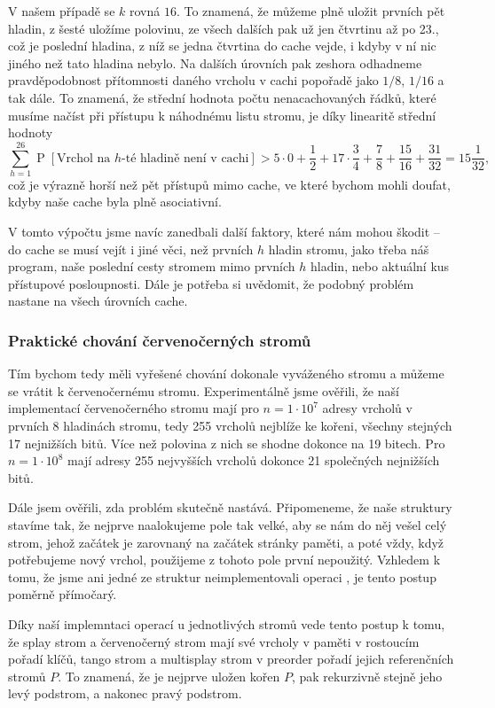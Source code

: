 V našem případě se $k$ rovná $16$. To znamená, že můžeme plně uložit prvních pět hladin, z
šesté uložíme polovinu, ze všech dalších pak už jen čtvrtinu až po 23., což je
poslední hladina, z níž se jedna čtvrtina do cache vejde, i kdyby v ní nic
jiného než tato hladina nebylo. Na dalších úrovních pak zeshora odhadneme
pravděpodobnost přítomnosti daného vrcholu v cachi popořadě jako $1/8$, $1/16$
a tak dále. To znamená, že střední hodnota počtu nenacachovaných řádků, které
musíme načíst při přístupu k náhodnému listu stromu, je díky linearitě střední
hodnoty $$\sum_{h=1}^{26} \operatorname{P}[\text{Vrchol na $h$-té hladině není v
cachi}] > 5 \cdot 0 +  \frac 12 + 17\cdot \frac34 + \frac78 + \frac{15}{16} + \frac{31}{32} = 15\frac1{32},$$ což je výrazně horší než pět přístupů mimo cache, ve které bychom mohli doufat, kdyby naše cache byla plně asociativní.   

V tomto výpočtu jsme navíc
zanedbali další faktory, které nám mohou škodit -- do cache se musí vejít i
jiné věci, než prvních $h$ hladin stromu, jako třeba náš program, naše poslední
cesty stromem mimo prvních $h$ hladin, nebo aktuální kus přístupové
posloupnosti. Dále je potřeba si uvědomit, že podobný problém nastane na všech
úrovních cache.

\subsubsection{Praktické chování červenočerných stromů}

Tím bychom tedy měli vyřešené chování dokonale vyváženého stromu a můžeme se
vrátit k červenočernému stromu. Experimentálně jsme ověřili, že naší
implementací červenočerného stromu mají pro $n=1\cdot 10^7$  adresy vrcholů v
prvních 8 hladinách stromu, tedy 255 vrcholů nejblíže ke kořeni, všechny
stejných 17 nejnižších bitů. Více než polovina z nich se shodne dokonce na 19
bitech. Pro $n=1\cdot10^8$ mají adresy 255 nejvyšších vrcholů dokonce 21
společných nejnižších bitů.   

Dále jsem ověřili, zda problém skutečně nastává. Připomeneme, že naše struktury stavíme tak, že nejprve naalokujeme pole tak velké, aby se nám do něj vešel celý strom, jehož začátek je zarovnaný na začátek stránky paměti, a poté vždy, když potřebujeme nový vrchol, použijeme z tohoto pole první nepoužitý. Vzhledem k tomu, že jsme ani jedné ze struktur neimplementovali operaci , je tento postup poměrně přímočarý.

Díky naší implemntaci operací  u jednotlivých stromů vede tento postup k tomu, že splay strom a červenočerný strom mají své vrcholy v paměti v rostoucím pořadí klíčů, tango strom a multisplay strom v preorder pořadí jejich referenčních stromů $P$. To znamená, že je nejprve uložen kořen $P$, pak rekurzivně stejně jeho levý podstrom, a nakonec pravý podstrom.

